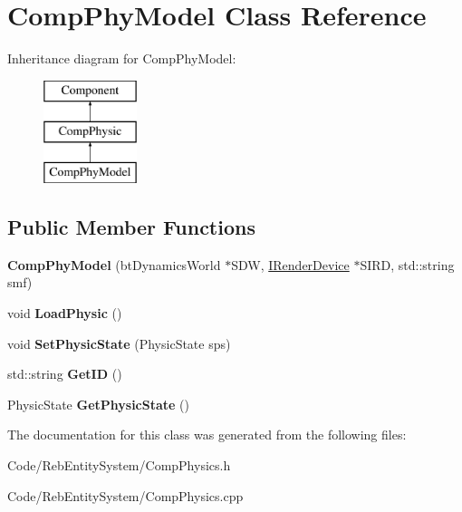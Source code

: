 \hypertarget{class_comp_phy_model}{}\section{Comp\+Phy\+Model Class Reference}
\label{class_comp_phy_model}
Inheritance diagram for Comp\+Phy\+Model\+:\begin{figure}[H]
\begin{center}
\leavevmode
\includegraphics[height=3.000000cm]{class_comp_phy_model}
\end{center}
\end{figure}
\subsection*{Public Member Functions}
\begin{DoxyCompactItemize}
\item 
{\bfseries Comp\+Phy\+Model} (bt\+Dynamics\+World $\ast$S\+DW, \hyperlink{class_i_render_device}{I\+Render\+Device} $\ast$S\+I\+RD, std\+::string smf)\hypertarget{class_comp_phy_model_ab33844f5ba2cecf276af4fad712ad151}{}\label{class_comp_phy_model_ab33844f5ba2cecf276af4fad712ad151}

\item 
void {\bfseries Load\+Physic} ()\hypertarget{class_comp_phy_model_a7739ac89dd8193a8e2f304d73f9bd079}{}\label{class_comp_phy_model_a7739ac89dd8193a8e2f304d73f9bd079}

\item 
void {\bfseries Set\+Physic\+State} (Physic\+State sps)\hypertarget{class_comp_phy_model_a92d33050fb33c0148d7d2d1cc802f67b}{}\label{class_comp_phy_model_a92d33050fb33c0148d7d2d1cc802f67b}

\item 
std\+::string {\bfseries Get\+ID} ()\hypertarget{class_comp_phy_model_a72c0bc83dc4bd8b6611bcf02b7850365}{}\label{class_comp_phy_model_a72c0bc83dc4bd8b6611bcf02b7850365}

\item 
Physic\+State {\bfseries Get\+Physic\+State} ()\hypertarget{class_comp_phy_model_a2c815b9e9b71a0ac2bde394444cb7078}{}\label{class_comp_phy_model_a2c815b9e9b71a0ac2bde394444cb7078}

\end{DoxyCompactItemize}


The documentation for this class was generated from the following files\+:\begin{DoxyCompactItemize}
\item 
Code/\+Reb\+Entity\+System/Comp\+Physics.\+h\item 
Code/\+Reb\+Entity\+System/Comp\+Physics.\+cpp\end{DoxyCompactItemize}
